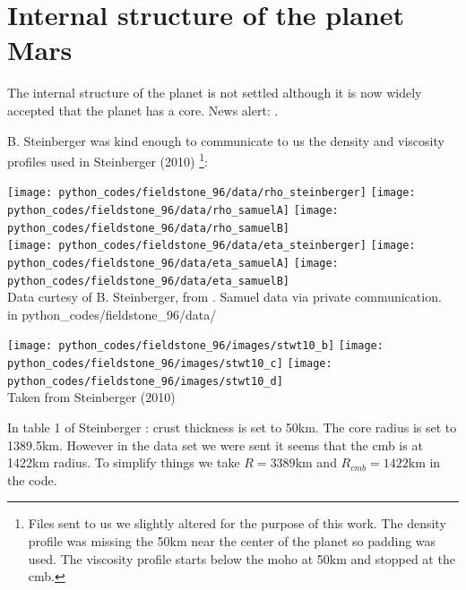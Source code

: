 \section*{Internal structure of the planet Mars}

The internal structure of the planet is not settled although 
it is now widely accepted that the planet has a core. News alert: \cite{khcv21,stkb21,knpb21}. 

B. Steinberger was kind enough to communicate to us the density and viscosity 
profiles used in Steinberger \etal (2010) \cite{stwt10} \footnote{Files sent to us 
we slightly altered for the purpose of this work. The density profile was missing 
the 50km near the center of the planet so padding was used. The viscosity profile 
starts below the moho at 50\si{\km} and stopped at the cmb.}:

\begin{center}
\texttt{[image: python\_codes/fieldstone\_96/data/rho\_steinberger]}
\texttt{[image: python\_codes/fieldstone\_96/data/rho\_samuelA]}
\texttt{[image: python\_codes/fieldstone\_96/data/rho\_samuelB]}\\
\texttt{[image: python\_codes/fieldstone\_96/data/eta\_steinberger]}
\texttt{[image: python\_codes/fieldstone\_96/data/eta\_samuelA]}
\texttt{[image: python\_codes/fieldstone\_96/data/eta\_samuelB]}\\
{\captionfont Data curtesy of B. Steinberger, from \cite{stwt10}.
Samuel data via private communication.} \\
{\tiny {\color{gray} in python\_codes/fieldstone\_96/data/}}
\end{center}

\begin{center}
\texttt{[image: python\_codes/fieldstone\_96/images/stwt10\_b]}
\texttt{[image: python\_codes/fieldstone\_96/images/stwt10\_c]}
\texttt{[image: python\_codes/fieldstone\_96/images/stwt10\_d]}\\
{\captionfont Taken from Steinberger \etal (2010) \cite{stwt10}}
\end{center}

In table 1 of Steinberger \etal \cite{stwt10}: crust thickness is set to 50km. The core radius is set 
to 1389.5km. However in the data set we were sent it seems that the cmb is at 1422\si{\km}
radius.
To simplify things we take $R=3389\si{\km}$ and $R_{cmb}=1422\si{\km}$ in the code.







